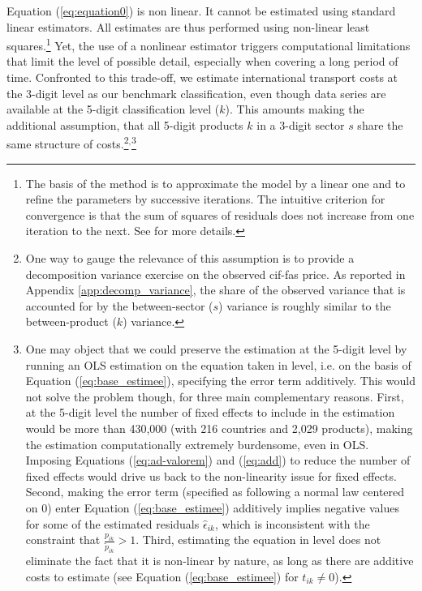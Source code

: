 \documentclass[a4paper,11pt]{article}
\begin{document}
Equation (\ref{eq:equation0}) is non linear.
It cannot be estimated using standard linear estimators.
All estimates are thus performed using non-linear least squares.\footnote{The basis of the method is to approximate the model by a linear one and to refine the parameters by successive iterations.
The intuitive criterion for convergence is that the sum of squares of residuals does not increase from one iteration to the next.
See \cite{Woolridge-Book-2001} for more details.} Yet, the use of a nonlinear estimator triggers computational limitations that limit the level of possible detail, especially when covering a long period of time.
Confronted to this trade-off, we estimate international transport costs at the 3-digit level as our benchmark classification, even though data series are available at the 5-digit classification level ($k$).
This amounts making the additional assumption, that all 5-digit products $k$ in a 3-digit sector $s$ share the
same structure of costs.\footnote{One way to gauge the relevance of this assumption is to provide a decomposition variance exercise on the observed cif-fas price.
As reported in Appendix \ref{app:decomp_variance}, the share of the observed variance that is accounted for by the between-sector ($s$) variance is roughly similar to the between-product ($k$) variance.}$^{,}$\footnote{One may object that we could preserve the estimation at the 5-digit level by running an OLS estimation on the equation taken in level, i.e.
on the basis of Equation (\ref{eq:base_estimee}), specifying the error term additively.
This would not solve the problem though, for three main complementary reasons.
First, at the 5-digit level the number of fixed effects to include in the estimation would be more than 430,000 (with 216 countries and 2,029 products), making the estimation computationally extremely burdensome, even in OLS.
Imposing Equations (\ref{eq:ad-valorem}) and (\ref{eq:add}) to reduce the number of fixed effects would drive us back to the non-linearity issue for fixed effects.
Second, making the error term (specified as following a normal law centered on 0) enter Equation (\ref{eq:base_estimee}) additively implies negative values for some of the estimated residuals $\widehat{\epsilon}_{ik}$, which is inconsistent with the constraint that $\frac{p_{ik}}{\widetilde{p}_{ik}}>1$.
Third, estimating the equation in level does not eliminate the fact that it is non-linear by nature, as long as there are additive costs to estimate (see Equation (\ref{eq:base_estimee}) for $t_{ik} \neq 0$).}
\end{document}
